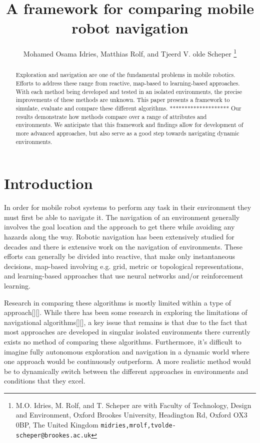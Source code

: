 \documentclass[letterpaper, 10 pt, conference]{ieeeconf}  %
\title{\LARGE \bf
A framework for comparing mobile robot navigation
}
\author{Mohamed Osama Idries, Matthias Rolf, and Tjeerd V. olde Scheper%
\thanks{M.O. Idries, M. Rolf, and T. Scheper are with Faculty of Technology, Design and Environment,
        Oxford Brookes University, Headington Rd, Oxford OX3 0BP, The United Kingdom
        {\tt\small {midries,mrolf,tvolde-scheper}@brookes.ac.uk}}%
}
\begin{document}
\maketitle
\thispagestyle{empty}
\pagestyle{empty}


\begin{abstract}
	Exploration and navigation are one of the fundamental problems in mobile robotics. Efforts to address these range from reactive, map-based to learning-based approaches. With each method being developed and tested in an isolated environments, the precise improvements of these methods are unknown. This paper presents a framework to simulate, evaluate and compare these different algorithms.
	********************
	Our results demonstrate how methods compare over a range of attributes and environments. We anticipate that this framework and findings allow for development of more advanced approaches, but also serve as a good step towards navigating dynamic environments. 
	
\end{abstract}


\section{Introduction}

In order for mobile robot systems to perform any task in their environment they must first be able to navigate it. The navigation of an environment generally involves the goal location and the approach to get there while avoiding any hazards along the way. Robotic navigation has been extensively studied for decades and there is extensive work on the navigation of environments. These efforts can generally be divided into reactive, that make only instantaneous decisions, map-based involving e.g. grid, metric or topological representations, and learning-based approaches that use neural networks and/or reinforcement learning. 

Research in comparing these algorithms is mostly limited within a type of approach[][]. While there has been some research in exploring the limitations of navigational algorithms[][], a key issue that remains is that due to the fact that most approaches are developed in singular isolated environments there currently exists no method of comparing these algorithms. Furthermore, it's difficult to imagine fully autonomous exploration and navigation in a dynamic world where one approach would be continuously outperform. A more realistic method would be to dynamically switch between the different approaches in environments and conditions that they excel. 
\end{document}

